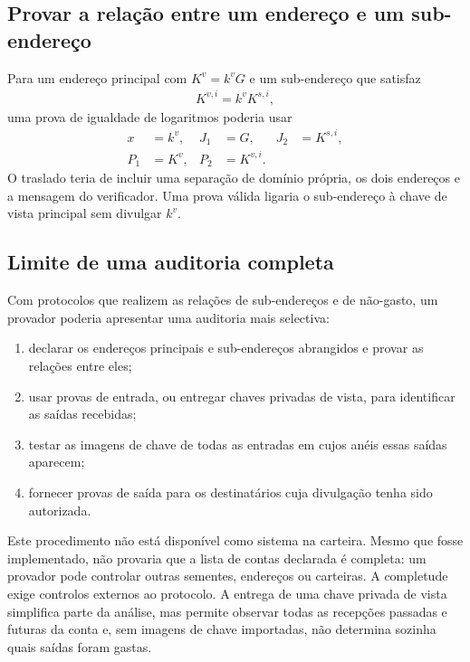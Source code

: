 \subsection{Provar a relação entre um endereço e um sub-endereço}
\label{subsec:proofs-address-subaddress-correspond-subaddressproof}

Para um endereço principal com
\(K^v=k^vG\) e um sub-endereço que satisfaz
\begin{align*}
 K^{v,i}=k^vK^{s,i},
\end{align*}
uma prova de igualdade de logaritmos poderia usar
\begin{align*}
 x&=k^v, & J_1&=G, & J_2&=K^{s,i},\\
 P_1&=K^v, & P_2&=K^{v,i}.
\end{align*}
O traslado teria de incluir uma separação de domínio própria, os dois
endereços e a mensagem do verificador. Uma prova válida ligaria o
sub-endereço à chave de vista principal sem divulgar \(k^v\).

\subsection{Limite de uma auditoria completa}
\label{subsec:audit-framework}
\label{sec:proofs-monero-audit-framework}

Com protocolos que realizem as relações de sub-endereços e de não-gasto,
um provador poderia apresentar uma auditoria mais selectiva:

\begin{enumerate}
 \item declarar os endereços principais e sub-endereços abrangidos e provar
 as relações entre eles;

 \item usar provas de entrada, ou entregar chaves privadas de vista, para
 identificar as saídas recebidas;

 \item testar as imagens de chave de todas as entradas em cujos anéis essas
 saídas aparecem;

 \item fornecer provas de saída para os destinatários cuja divulgação tenha
 sido autorizada.
\end{enumerate}

Este procedimento não está disponível como sistema na carteira. Mesmo que
fosse implementado, não provaria que a lista de contas declarada é completa:
um provador pode controlar outras sementes, endereços ou carteiras. A
completude exige controlos externos ao protocolo. A entrega de uma chave
privada de vista simplifica parte da análise, mas permite observar todas as
recepções passadas e futuras da conta e, sem imagens de chave importadas, não
determina sozinha quais saídas foram gastas.
